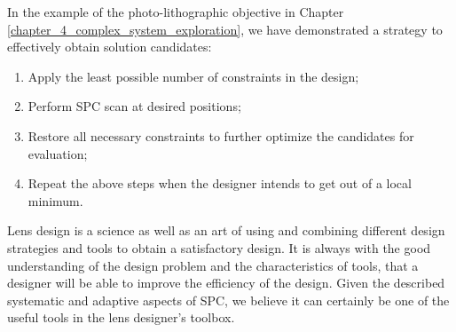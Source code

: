 In the example of the photo-lithographic objective in Chapter \ref{chapter_4_complex_system_exploration}, we have demonstrated a strategy to effectively obtain solution candidates:

\begin{enumerate}[nosep]
\item Apply the least possible number of constraints in the design;
\item Perform SPC scan at desired positions;
\item Restore all necessary constraints to further optimize the candidates for evaluation; 
\item Repeat the above steps when the designer intends to get out of a local minimum.
\end{enumerate}


Lens design is a science as well as an art of using and combining different design strategies and tools to obtain a satisfactory design. It is always with the good understanding of the design problem and the characteristics of tools, that a designer will be able to improve the efficiency of the design. Given the described systematic and adaptive aspects of SPC, we believe it can certainly be one of the useful tools in the lens designer's toolbox.  

